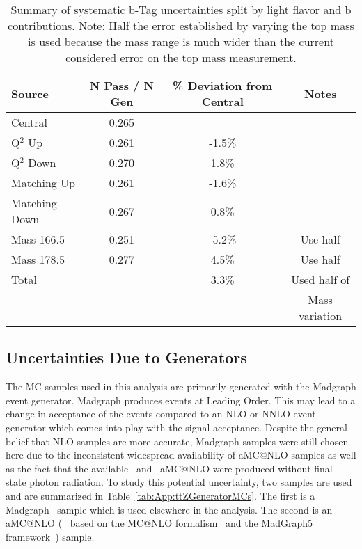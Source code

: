 \begin{table}[h]
\caption{\label{tab:systupdown} Summary of systematic b-Tag uncertainties split by light flavor and b contributions. Note: Half the error established by varying the top mass is used because the mass range is much wider than the current considered error on the top mass measurement.}
\begin{center}
\begin{tabular}{lccc}\hline
Source                  &  N Pass / N Gen & \% Deviation from Central & Notes\\ \hline
Central                 & 0.265 & & \\
Q$^2$ Up                 & 0.261 & -1.5\% & \\
Q$^2$ Down           & 0.270 & 1.8\% & \\
Matching Up       & 0.261 & -1.6\% & \\
Matching Down  & 0.267 & 0.8\% & \\
Mass 166.5         & 0.251 & -5.2\% & Use half \\
Mass 178.5         & 0.277 & 4.5\% & Use half \\
\hline
Total                     &             & 3.3\% & Used half of\\
                              &             &             & Mass variation \\
\hline
\end{tabular}
\end{center}
\end{table}



\subsection{Uncertainties Due to Generators}	

The MC samples used in this analysis are primarily generated with the Madgraph event generator. Madgraph produces events at Leading Order. This may lead to a change in acceptance of the events compared to an NLO or NNLO event generator which comes into play with the signal acceptance. Despite the general belief that NLO samples are more accurate, Madgraph samples were still chosen here due to the inconsistent widespread availability of aMC@NLO samples as well as the fact that the available \ttZ \ and \ttW \ aMC@NLO were produced without final state photon radiation. To study this potential uncertainty, two \ttZ samples are used and are summarized in Table~\ref{tab:App:ttZGeneratorMCs}. The first is a Madgraph~\cite{Alwall:2011uj} sample which is used elsewhere in the analysis. The second is an aMC@NLO (~\cite{Frederix:2011zi, Frederix:2011ss} based on the MC@NLO formalism~\cite{Frixione:2002ik} and the MadGraph5 framework~\cite{Alwall:2011uj}) sample. \\




